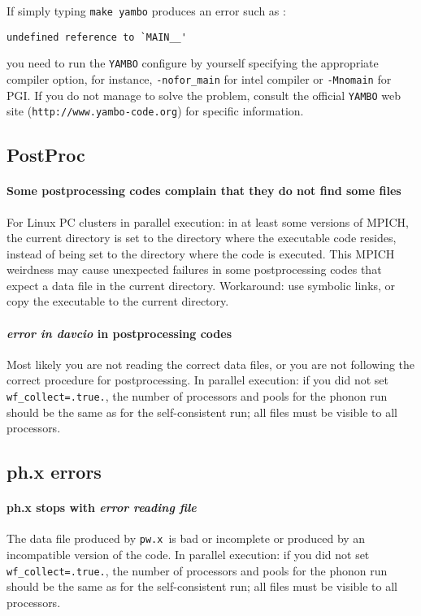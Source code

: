 \documentclass[12pt,a4paper]{article}
\def\pwx{\texttt{pw.x}}
\begin{document}
If simply typing \texttt{make yambo} produces an error such as : 
\begin{verbatim}
undefined reference to `MAIN__'
\end{verbatim}
you need to run the \texttt{YAMBO} configure by yourself specifying the 
appropriate compiler option, for instance,
\texttt{-nofor\_main} for intel compiler or \texttt{-Mnomain} 
for PGI. If you do not manage to solve
the problem, consult the official \texttt{YAMBO} web site
(\texttt{http://www.yambo-code.org}) for specific information.

\subsection{PostProc}

\paragraph{Some postprocessing codes complain that they do not find some files}
For Linux PC clusters in parallel execution: in at least some versions
of MPICH, the current directory is set to the directory where the executable
code resides, instead of being set to the directory where the code is executed.
This MPICH weirdness may cause unexpected failures in some postprocessing
codes that expect a data file in the current directory. Workaround: use
symbolic links, or copy the executable to the current directory.

\paragraph{{\em error in davcio} in postprocessing codes}
Most likely you are not reading the correct data files, or you are not
following the correct procedure for postprocessing. In parallel execution: 
if you did not set \texttt{wf\_collect=.true.}, the number of processors and 
pools for the phonon run should be the same as for the
self-consistent run; all files must be visible to all processors.

\subsection{ph.x errors}

\paragraph{ph.x stops with {\em error reading file}}
The data file produced by \pwx\ is bad or incomplete or produced
by an incompatible version of the code.
In parallel execution: if you did not set \texttt{wf\_collect=.true.}, the number
of processors and pools for the phonon run should be the same as for the
self-consistent run; all files must be visible to all processors.
\end{document}
